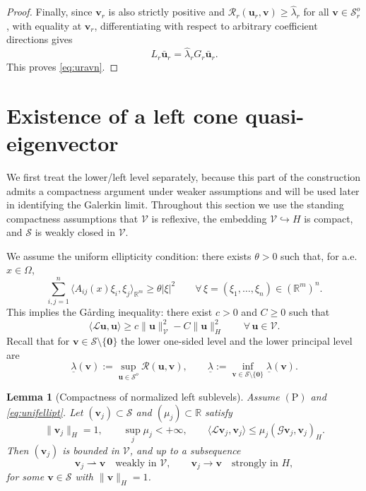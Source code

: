\documentclass[10pt,a4paper]{amsart}
\newtheorem{lemma}{Lemma}
\begin{document}
\begin{proof}
	Finally, since $\mathbf{v}_r$ is also strictly positive and
	$\mathcal{R}_r(\mathbf{u}_r,\mathbf{v})\ge\hat\lambda_r$ for all
	$\mathbf v\in\mathcal S_r^o$, with equality at $\mathbf v_r$, differentiating
	with respect to arbitrary coefficient directions gives
	\[
	L_r\bar{\mathbf{u}}_r=\hat\lambda_r G_r\bar{\mathbf{u}}_r.
	\]
	This proves \eqref{eq:uravn}.
\end{proof}


\section{Existence of a left cone quasi-eigenvector}
\label{sec:left-minimax-attainment}

We first treat the lower/left level separately, because this part of the
construction admits a compactness argument under weaker assumptions and will
be used later in identifying the Galerkin limit. Throughout this section we
use the standing compactness assumptions that $\mathcal V$ is reflexive, the
embedding $\mathcal V\hookrightarrow H$ is compact, and $\mathcal S$ is weakly
closed in $\mathcal V$.

We assume the uniform ellipticity condition: there exists $\theta>0$ such that,
for a.e.\ $x\in\Omega$,
\begin{equation}\label{eq:unifellipt}
	\sum_{i,j=1}^n
	\langle A_{ij}(x)\xi_i,\xi_j\rangle_{\mathbb{R}^m}
	\ge \theta|\xi|^2
	\qquad
	\forall\,\xi=(\xi_1,\ldots,\xi_n)\in(\mathbb{R}^m)^n.
\end{equation}
This implies the G{\aa}rding inequality: there exist $c>0$ and $C\ge0$ such that
\[
\langle\mathcal{L}\mathbf{u},\mathbf{u}\rangle
\ge c\|\mathbf{u}\|_{\mathcal{V}}^2 - C\|\mathbf{u}\|_H^2
\qquad
\forall\,\mathbf{u}\in\mathcal{V}.
\]
Recall that for $\mathbf{v}\in\mathcal{S}\setminus\{\mathbf{0}\}$ the lower
one-sided level and the lower principal level are
\[
\underline\lambda(\mathbf{v})
:= \sup_{\mathbf{u}\in\mathcal{S}^o}\mathcal{R}(\mathbf{u},\mathbf{v}),
\qquad
\underline\lambda
:= \inf_{\mathbf{v}\in\mathcal{S}\setminus\{\mathbf{0}\}}\underline\lambda(\mathbf{v}).
\]

\begin{lemma}[Compactness of normalized left sublevels]
	\label{lem:left-sublevel-compactness}
	Assume $\mathrm{(P)}$ and \eqref{eq:unifellipt}. Let
	$(\mathbf{v}_j)\subset\mathcal{S}$ and $(\mu_j)\subset\mathbb{R}$ satisfy
	\[
	\|\mathbf{v}_j\|_H=1,
	\qquad \sup_j\mu_j<+\infty,
	\qquad
	\langle\mathcal{L}\mathbf{v}_j,\mathbf{v}_j\rangle
	\le \mu_j(\mathcal{G}\mathbf{v}_j,\mathbf{v}_j)_H.
	\]
	Then $(\mathbf{v}_j)$ is bounded in $\mathcal{V}$, and up to a subsequence
	\[
	\mathbf{v}_j\rightharpoonup\mathbf{v}
	\quad\text{weakly in }\mathcal{V},
	\qquad
	\mathbf{v}_j\to\mathbf{v}
	\quad\text{strongly in }H,
	\]
	for some $\mathbf{v}\in\mathcal{S}$ with $\|\mathbf{v}\|_H=1$.
\end{lemma}
\end{document}
